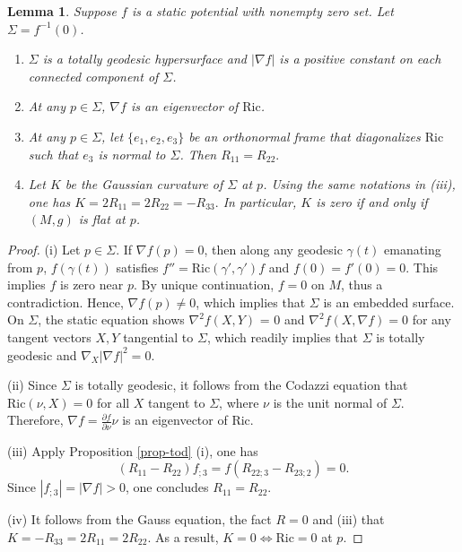 \documentclass[12pt]{amsart}
\newtheorem{lma}{Lemma}[section]
\theoremstyle{remark}
\numberwithin{equation}{section}
\newcommand{\Ric}{\mbox{Ric}}
\def\p{\partial}
\def\S{\Sigma}
\begin{document}
\begin{lma}\label{lma-static-basic} Suppose $f$ is  a static potential with nonempty zero set. Let $\S=f^{-1}(0)$.
\begin{enumerate}
  \item [(i)] $\S$ is a totally geodesic hypersurface and
   $|\nabla f|$ is a positive constant on each connected component of $ \S$.
  \item [(ii)] At   any $p \in \S$, $\nabla f$ is an eigenvector of  $\Ric$.
\item [(iii)]  At any $ p \in \S$, let $\{ e_1,e_2, e_3 \}$ be an  orthonormal frame
that diagonalizes $ \Ric$ such that   $e_3$ is normal to $\S$.
Then
$R_{11} = R_{22} .$
\item[(iv)] Let $ K $ be the Gaussian curvature of $ \S$ at $ p$.
Using the same notations  in (iii),  one has
$ K  = 2 R_{11} = 2 R_{22}=-R_{33} .$
In particular, $K$ is  zero if and only if $ (M, g)$ is  flat at $p$.
\end{enumerate}

\end{lma}
\begin{proof} (i)
Let $ p \in \S$. If $ \nabla f(p)=0$, then along any geodesic $\gamma(t)$ emanating from $p$, $f(\gamma(t))$ satisfies $f''=\Ric(\gamma',\gamma')f$
and  $f(0)=f'(0)=0$.  This implies $f$ is zero near $p$. By unique continuation, $f = 0$ on $M$, thus a contradiction. Hence, $ \nabla f (p) \neq 0 $, which
implies  that  $\S$ is an embedded surface.
On $ \S$, the static equation shows   $ \nabla^2 f (X, Y) $ = 0  and $ \nabla^2 f (X, \nabla f ) = 0 $ for any tangent vectors  $X, Y$ tangential to $ \S$,
which readily  implies  that $ \S$ is totally geodesic and $ \nabla_X | \nabla f |^2 = 0 $.



(ii)  Since  $\S$ is totally geodesic,  it follows from the Codazzi equation that   $\Ric(\nu,X)=0$ for all $X$ tangent to $ \S$, where $\nu$ is the unit normal of $\S$.
Therefore, $ \nabla f = \frac{\p f}{\p \nu} \nu $ is an eigenvector of $ \Ric$.

(iii)  Apply  Proposition \ref{prop-tod} (i), one has
$$ ( R_{11} - R_{22} ) f_{;3}  = f ( R_{22;3} - R_{23;2} ) =  0  . $$
Since  $|f_{;3}|=|\nabla f|>0$, one concludes  $ R_{11} = R_{22}$.

(iv)   It follows from the  Gauss equation,  the fact $ R =0$ and (iii)  that $ K = - R_{33} = 2 R_{11} = 2 R_{22}$.
As a result, $ K = 0 \Leftrightarrow \Ric = 0 $ at $p$.

\end{proof}
\end{document}
